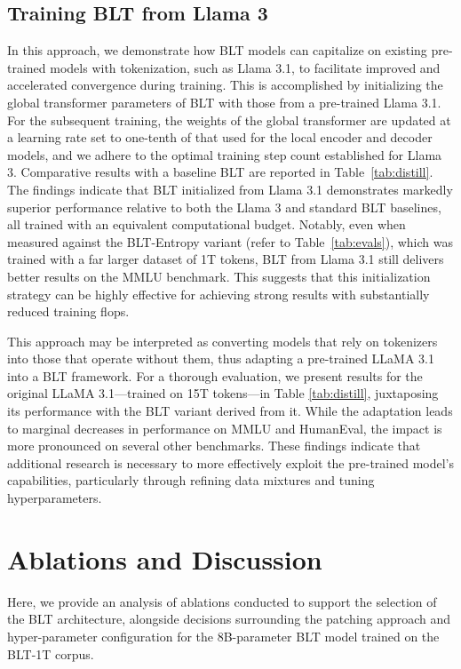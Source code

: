 \subsection{Training {\textsc BLT} from Llama 3}
\label{sec:distillation}
In this approach, we demonstrate how {\textsc BLT} models can capitalize on existing pre-trained models with tokenization, such as Llama 3.1, to facilitate improved and accelerated convergence during training. This is accomplished by initializing the global transformer parameters of {\textsc BLT} with those from a pre-trained Llama 3.1. For the subsequent training, the weights of the global transformer are updated at a learning rate set to one-tenth of that used for the local encoder and decoder models, and we adhere to the optimal training step count established for Llama 3. Comparative results with a baseline {\textsc BLT} are reported in Table~\ref{tab:distill}. The findings indicate that {\textsc BLT} initialized from Llama 3.1 demonstrates markedly superior performance relative to both the Llama 3 and standard {\textsc BLT} baselines, all trained with an equivalent computational budget. Notably, even when measured against the {\textsc BLT}-Entropy variant (refer to Table~\ref{tab:evals}), which was trained with a far larger dataset of 1T tokens, {\textsc BLT} from Llama 3.1 still delivers better results on the MMLU benchmark. This suggests that this initialization strategy can be highly effective for achieving strong results with substantially reduced training flops.

This approach may be interpreted as converting models that rely on tokenizers into those that operate without them, thus adapting a pre-trained LLaMA 3.1 into a {\textsc BLT} framework. For a thorough evaluation, we present results for the original LLaMA 3.1—trained on 15T tokens—in Table \ref{tab:distill}, juxtaposing its performance with the {\textsc BLT} variant derived from it. While the adaptation leads to marginal decreases in performance on MMLU and HumanEval, the impact is more pronounced on several other benchmarks. These findings indicate that additional research is necessary to more effectively exploit the pre-trained model's capabilities, particularly through refining data mixtures and tuning hyperparameters.

\section{Ablations and Discussion}
\label{section:ablations}
Here, we provide an analysis of ablations conducted to support the selection of the {\textsc BLT} architecture, alongside decisions surrounding the patching approach and hyper-parameter configuration for the 8B-parameter {\textsc BLT} model trained on the {\textsc BLT}-1T corpus.

